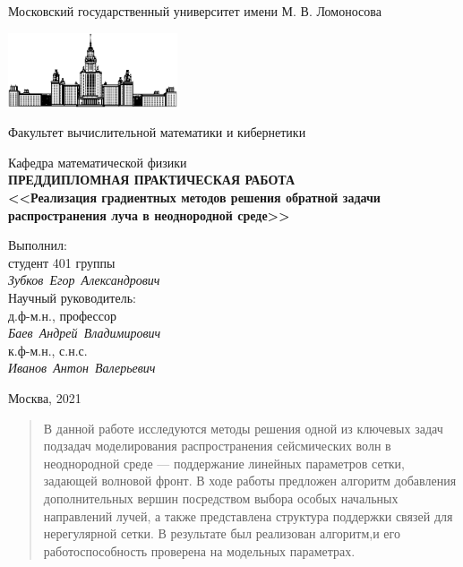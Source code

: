 \documentclass[12pt, cleqn, a4paper]{article}
\begin{document}
\begin{titlepage}
\begin{center}
    Московский государственный университет имени М. В. Ломоносова

    \bigskip
    \includegraphics[width=50mm]{msu.eps}

    \bigskip
    Факультет вычислительной математики и кибернетики
    
    Кафедра математической физики\\[10mm]

    \textsf{\large\bfseries
        ПРЕДДИПЛОМНАЯ ПРАКТИЧЕСКАЯ РАБОТА\\[10mm]
        <<Реализация градиентных методов решения обратной задачи распространения луча в неоднородной среде>>
    }\\[30mm]

    \begin{flushright}
        \parbox{0.35\textwidth}{
            Выполнил:\\
            студент 401 группы\\
            \emph{Зубков~Егор~Александрович}\\[10mm]
            Научный руководитель:\\
            д.ф-м.н., профессор\\
            \emph{Баев~Андрей~Владимирович}\\[2mm]
            к.ф-м.н., с.н.с.\\
            \emph{Иванов~Антон~Валерьевич}
        }
    \end{flushright}

    

    \vspace{\fill}
    Москва, 2021
\end{center}
\end{titlepage}

\newpage
\renewcommand{\contentsname}{Содержание}
\tableofcontents
\newpage
\begin{abstract}

В данной работе исследуются методы решения одной из ключевых задач подзадач моделирования распространения сейсмических волн в неоднородной среде --- поддержание линейных параметров сетки, задающей волновой фронт. В ходе работы предложен алгоритм добавления дополнительных вершин посредством выбора особых начальных направлений лучей, а также представлена структура поддержки связей для нерегулярной сетки. В результате был реализован алгоритм,и его работоспособность проверена на модельных параметрах.

\end{abstract}
\end{document}
